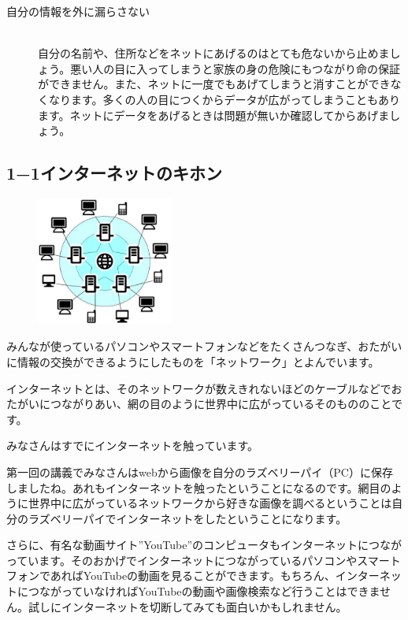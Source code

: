 \documentclass[a4paper,12pt,dvipdfmx]{jarticle}
\begin{document}
\begin{description}
	\item[自分の情報を外に漏らさない]~\\
	自分の名前や、住所などをネットにあげるのはとても危ないから止めましょう。悪い人の目に入ってしまうと家族の身の危険にもつながり命の保証ができません。また、ネットに一度でもあげてしまうと消すことができなくなります。多くの人の目につくからデータが広がってしまうこともあります。ネットにデータをあげるときは問題が無いか確認してからあげましょう。
\end{description}

\clearpage\subsection*{1−1インターネットのキホン}
\begin{figure}
	\includegraphics[width=0.4\textwidth]{ome7-img002.eps}
\end{figure}
みんなが使っているパソコンやスマートフォンなどをたくさんつなぎ、おたがいに情報の交換ができるようにしたものを「ネットワーク」とよんでいます。

インターネットとは、そのネットワークが数えきれないほどのケーブルなどでおたがいにつながりあい、網の目のように世界中に広がっているそのもののことです。



\bigskip

みなさんはすでにインターネットを触っています。

第一回の講義でみなさんはwebから画像を自分のラズベリーパイ（PC）に保存しましたね。あれもインターネットを触ったということになるのです。網目のように世界中に広がっているネットワークから好きな画像を調べるということは自分のラズベリーパイでインターネットをしたということになります。

さらに、有名な動画サイト”YouTube”のコンピュータもインターネットにつながっています。そのおかげでインターネットにつながっているパソコンやスマートフォンであればYouTubeの動画を見ることができます。もちろん、インターネットにつながっていなければYouTubeの動画や画像検索など行うことはできません。試しにインターネットを切断してみても面白いかもしれません。
\end{document}
